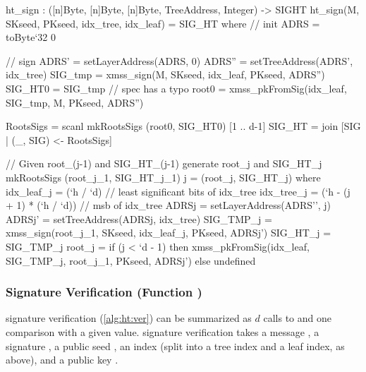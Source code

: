 \begin{code}
  ht_sign : ([n]Byte, [n]Byte, [n]Byte, TreeAddress, Integer) -> SIGHT
  ht_sign(M, SKseed, PKseed, idx_tree, idx_leaf) = SIG_HT where
    // init
    ADRS = toByte`{32} 0

    // sign
    ADRS' = setLayerAddress(ADRS, 0)
    ADRS'' = setTreeAddress(ADRS', idx_tree)
    SIG_tmp = xmss_sign(M, SKseed, idx_leaf, PKseed, ADRS'')
    SIG_HT0 = SIG_tmp // spec has a typo
    root0 = xmss_pkFromSig(idx_leaf, SIG_tmp, M, PKseed, ADRS'')

    RootsSigs = scanl mkRootsSigs (root0, SIG_HT0) [1 .. d-1]
    SIG_HT = join [SIG | (_, SIG) <- RootsSigs]

    // Given root_(j-1) and SIG_HT_(j-1) generate root_j and SIG_HT_j
    mkRootsSigs (root_j_1, SIG_HT_j_1) j = (root_j, SIG_HT_j) where
      idx_leaf_j = (`h / `d) // least significant bits of idx_tree
      idx_tree_j = (`h - (j + 1) * (`h / `d)) // msb of idx_tree
      ADRSj = setLayerAddress(ADRS'', j)
      ADRSj' = setTreeAddress(ADRSj, idx_tree)
      SIG_TMP_j = xmss_sign(root_j_1, SKseed, idx_leaf_j, PKseed, ADRSj')
      SIG_HT_j = SIG_TMP_j
      root_j =
        if (j < `d - 1) then
          xmss_pkFromSig(idx_leaf, SIG_TMP_j, root_j_1, PKseed, ADRSj')
        else
          undefined
\end{code}

\subsubsection{\hyper Signature Verification (Function \htverify)}

   \hyper signature verification (\autoref{alg:ht:ver}) can be summarized as $d$
   calls to \xmsspkfromsig and one comparison with a given value. \hyper
   signature verification takes a message \msg, a signature \htsig, a public seed \pseed, an index
   \idx (split into a tree index and a leaf index, as above), and a \hyper public key \htpk.

